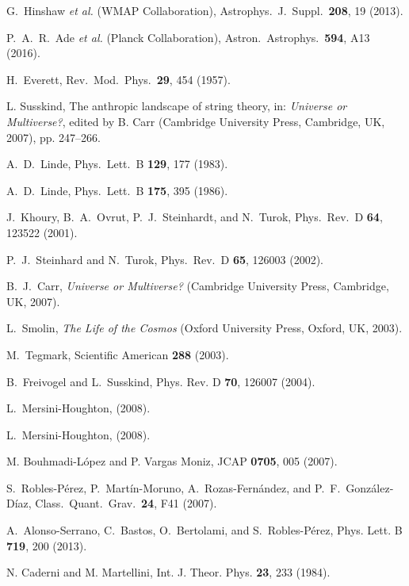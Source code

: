\documentclass[aps,nofootinbib,prd,superscriptaddress,eqsecnum,showpacs,showkeys,preprintnumbers,altaffilletter]{revtex4}
\begin{document}
\begin{thebibliography}{99}
  G.~Hinshaw {\it et al.} (WMAP Collaboration),
  Astrophys.\ J.\ Suppl.\  {\bf 208}, 19 (2013).

  P.~A.~R.~Ade {\it et al.} (Planck Collaboration),
  Astron.\ Astrophys.\  {\bf 594}, A13 (2016).

  H.~Everett,
  Rev.\ Mod.\ Phys.\  {\bf 29}, 454 (1957).

  L. Susskind,
  The anthropic landscape of string theory, in: {\it Universe or Multiverse?},
  edited by B. Carr (Cambridge University Press, Cambridge, UK, 2007), pp. 247--266.

  A.~D.~Linde,
  Phys.\ Lett.\ B {\bf 129}, 177 (1983).

  A.~D.~Linde,
  Phys.\ Lett.\ B {\bf 175}, 395 (1986).

  J.~Khoury, B.~A.~Ovrut, P.~J.~Steinhardt, and N.~Turok,
  Phys.\ Rev.\ D {\bf 64}, 123522 (2001).
  
 P.~J.~Steinhard and N.~Turok,
 Phys.\ Rev.\ D {\bf 65}, 126003 (2002).
	
  B.~J.~Carr,
  {\it Universe or Multiverse?}
  (Cambridge University Press, Cambridge, UK, 2007).

 L.~Smolin, 
 {\it The Life of the Cosmos}
 (Oxford University Press, Oxford, UK, 2003).

 M.~Tegmark,
  Scientific American {\bf 288} (2003).

B.~Freivogel and L.~Susskind,
  Phys. Rev. D {\bf 70}, 126007 (2004).
  
L.~Mersini-Houghton, 
 (2008).
  
L.~Mersini-Houghton, 
 (2008).

M. Bouhmadi-L\'opez and P. Vargas Moniz, 
JCAP {\bf 0705}, 005 (2007).
  
  S.~Robles-P\'erez, P.~Mart\'in-Moruno, A.~Rozas-Fern\'andez, and P.~F.~Gonz\'alez-D\'iaz,
  Class.\ Quant.\ Grav.\  {\bf 24}, F41 (2007).

 A.~Alonso-Serrano, C.~Bastos, O.~Bertolami, and S.~Robles-P{\'e}rez,
 Phys. Lett. B {\bf 719}, 200 (2013).

N. Caderni and M. Martellini, 
Int. J. Theor. Phys. {\bf 23}, 233 (1984).


\end{thebibliography}
\end{document}
